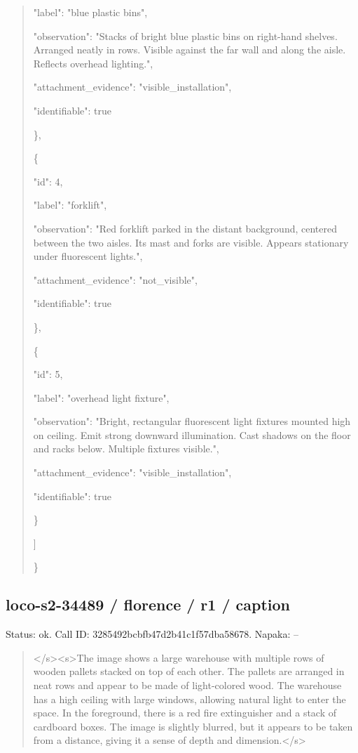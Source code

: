 \documentclass[10pt,a4paper]{article}
\begin{document}
\begin{quote}
      "label":\allowbreak{} "blue plastic bins",\allowbreak{}\par
      "observation":\allowbreak{} "Stacks of bright blue plastic bins on right-hand shelves. Arranged neatly in rows. Visible against the far wall and along the aisle. Reflects overhead lighting.",\allowbreak{}\par
      "attachment\_evidence":\allowbreak{} "visible\_installation",\allowbreak{}\par
      "identifiable":\allowbreak{} true\par
    \},\allowbreak{}\par
    \{\par
      "id":\allowbreak{} 4,\allowbreak{}\par
      "label":\allowbreak{} "forklift",\allowbreak{}\par
      "observation":\allowbreak{} "Red forklift parked in the distant background,\allowbreak{} centered between the two aisles. Its mast and forks are visible. Appears stationary under fluorescent lights.",\allowbreak{}\par
      "attachment\_evidence":\allowbreak{} "not\_visible",\allowbreak{}\par
      "identifiable":\allowbreak{} true\par
    \},\allowbreak{}\par
    \{\par
      "id":\allowbreak{} 5,\allowbreak{}\par
      "label":\allowbreak{} "overhead light fixture",\allowbreak{}\par
      "observation":\allowbreak{} "Bright,\allowbreak{} rectangular fluorescent light fixtures mounted high on ceiling. Emit strong downward illumination. Cast shadows on the floor and racks below. Multiple fixtures visible.",\allowbreak{}\par
      "attachment\_evidence":\allowbreak{} "visible\_installation",\allowbreak{}\par
      "identifiable":\allowbreak{} true\par
    \}\par
  ]\par
\}
\end{quote}
\subsection*{loco-s2-34489 / florence / r1 / caption}
Status: ok. Call ID: 3285492bcbfb47d2b41c1f57dba58678. Napaka: --
\begin{quote}\footnotesize
</s>\allowbreak{}<s>\allowbreak{}The image shows a large warehouse with multiple rows of wooden pallets stacked on top of each other. The pallets are arranged in neat rows and appear to be made of light-colored wood. The warehouse has a high ceiling with large windows,\allowbreak{} allowing natural light to enter the space. In the foreground,\allowbreak{} there is a red fire extinguisher and a stack of cardboard boxes. The image is slightly blurred,\allowbreak{} but it appears to be taken from a distance,\allowbreak{} giving it a sense of depth and dimension.</s>\allowbreak{}
\end{quote}
\end{document}
